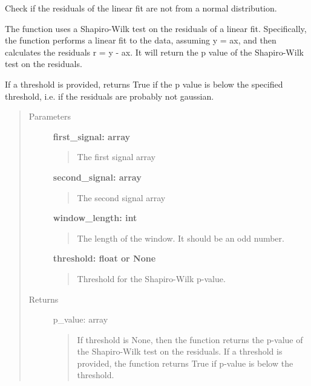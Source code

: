 \documentclass[letterpaper,10pt,english]{sphinxmanual}
\begin{document}
\begin{fulllineitems}
\label{fit_checks:fit_checks.sliding_check_residuals_not_gaussian}
Check if the residuals of the linear fit are not from a normal distribution.

The function uses a Shapiro-Wilk test on the residuals of a linear fit. Specifically,
the function performs a linear fit to the data, assuming y = ax, and then calculates the residuals
r = y - ax. It will return the p value of the Shapiro-Wilk test on the residuals.

If a threshold is provided, returns True if the p value is below the specified threshold, i.e. if
the residuals are probably not gaussian.
\begin{quote}\begin{description}
\item[{Parameters}] \leavevmode
\textbf{first\_signal: array}
\begin{quote}

The first signal array
\end{quote}

\textbf{second\_signal: array}
\begin{quote}

The second signal array
\end{quote}

\textbf{window\_length: int}
\begin{quote}

The length of the window. It should be an odd number.
\end{quote}

\textbf{threshold: float or None}
\begin{quote}

Threshold for the Shapiro-Wilk p-value.
\end{quote}

\item[{Returns}] \leavevmode
p\_value: array
\begin{quote}

If threshold is None, then the function returns the p-value of the Shapiro-Wilk test on the residuals.
If a threshold is provided, the function returns True if p-value is below the threshold.
\end{quote}

\end{description}\end{quote}

\end{fulllineitems}
\end{document}
